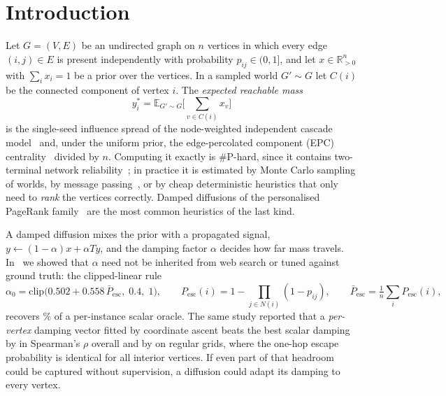 \documentclass[11pt,a4paper]{article}
\theoremstyle{definition}
\theoremstyle{plain}
\newcommand{\Pesc}{P_{\mathrm{esc}}}
\newcommand{\Pescbar}{\bar{P}_{\mathrm{esc}}}
\newcommand{\clip}{\mathrm{clip}}
\newcommand{\E}{\mathbb{E}}
\begin{document}
\section{Introduction}\label{sec:intro}

Let $G=(V,E)$ be an undirected graph on $n$ vertices in which every edge $(i,j)\in E$ is present independently with probability $p_{ij}\in(0,1]$, and let $x\in\mathbb{R}^n_{>0}$ with $\sum_ix_i=1$ be a prior over the vertices. In a sampled world $G'\sim G$ let $C(i)$ be the connected component of vertex $i$. The \emph{expected reachable mass}
\begin{equation}\label{eq:target}
y^*_i=\E_{G'\sim G}\Big[\sum_{v\in C(i)}x_v\Big]
\end{equation}
is the single-seed influence spread of the node-weighted independent cascade model~\cite{kkt03} and, under the uniform prior, the edge-percolated component (EPC) centrality~\cite{hubba08,cytohubba14} divided by $n$. Computing it exactly is \#P-hard, since it contains two-terminal network reliability~\cite{provanball83}; in practice it is estimated by Monte Carlo sampling of worlds, by message passing~\cite{knz14}, or by cheap deterministic heuristics that only need to \emph{rank} the vertices correctly. Damped diffusions of the personalised PageRank family~\cite{pagerank99,jeh03,haveliwala03,gleich15} are the most common heuristics of the last kind.

A damped diffusion mixes the prior with a propagated signal, $y\leftarrow(1-\alpha)x+\alpha Ty$, and the damping factor $\alpha$ decides how far mass travels. In~\cite{konstantellos26} we showed that $\alpha$ need not be inherited from web search or tuned against ground truth: the clipped-linear rule
\begin{equation}\label{eq:rule}
\alpha_0=\clip\big(0.502+0.558\,\Pescbar,\;0.4,\;1\big),\qquad \Pesc(i)=1-\prod_{j\in N(i)}(1-p_{ij}),\qquad \Pescbar=\tfrac1n\textstyle\sum_i\Pesc(i),
\end{equation}
recovers \PrevPctOracle\% of a per-instance scalar oracle. The same study reported that a \emph{per-vertex} damping vector fitted by coordinate ascent beats the best scalar damping by \PrevHeadAll{} in Spearman's $\rho$ overall and by \PrevHeadGrid{} on regular grids, where the one-hop escape probability is identical for all interior vertices. If even part of that headroom could be captured without supervision, a diffusion could adapt its damping to every vertex.
\end{document}

